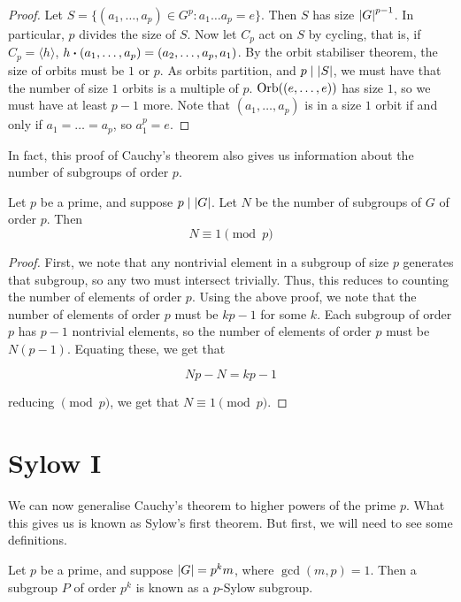 \documentclass{article}
\begin{document}
    \begin{proof}
        Let $S = \{(a_1, \dots, a_p) \in G^p : a_1\dots a_p = e\}$. Then $S$ has size $\abs{G}^{p-1}$. In particular, $p$ divides the size of $S$. Now let $C_p$ act on $S$ by cycling, that is, if $C_p = \langle h \rangle$, $h \vdot (a_1, \dots, a_p) = (a_2, \dots, a_p, a_1)$. By the orbit stabiliser theorem, the size of orbits must be $1$ or $p$. As orbits partition, and $p \mid \abs{S}$, we must have that the number of size $1$ orbits is a multiple of $p$. $\operatorname{Orb}((e, \dots, e))$ has size $1$, so we must have at least $p - 1$ more. Note that $(a_1, \dots, a_p)$ is in a size $1$ orbit if and only if $a_1 =  \dots = a_p$, so $a_1^p = e$.
    \end{proof}

    In fact, this proof of Cauchy's theorem also gives us information about the number of subgroups of order $p$.

    \begin{proposition*}
        Let $p$ be a prime, and suppose $p \mid \abs{G}$. Let $N$ be the number of subgroups of $G$ of order $p$. Then 
        $$N \equiv 1 \pmod{p}$$
    \end{proposition*}

    \begin{proof}
        First, we note that any nontrivial element in a subgroup of size $p$ generates that subgroup, so any two must intersect trivially. Thus, this reduces to counting the number of elements of order $p$. Using the above proof, we note that the number of elements of order $p$ must be $kp - 1$ for some $k$. Each subgroup of order $p$ has $p-1$ nontrivial elements, so the number of elements of order $p$ must be $N(p-1)$. Equating these, we get that

        $$Np - N = kp - 1$$

        reducing $\pmod{p}$, we get that $N \equiv 1 \pmod{p}$.
    \end{proof}

    \section{Sylow I}

    We can now generalise Cauchy's theorem to higher powers of the prime $p$. What this gives us is known as Sylow's first theorem. But first, we will need to see some definitions.

    \begin{definition*}

        Let $p$ be a prime, and suppose $\abs{G} = p^k m$, where $\gcd(m, p) = 1$. Then a subgroup $P$ of order $p^k$ is known as a $p$-Sylow subgroup.
    \end{definition*}
\end{document}
